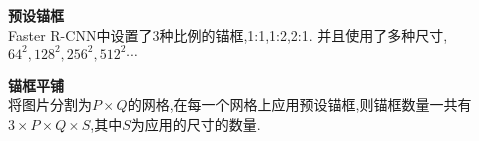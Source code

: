 \begin{frame}
    \vspace{0.5em}
    \noindent\large\textbf{预设锚框}\\
    \vspace{0.5em}
    Faster R-CNN中设置了3种比例的锚框,1:1,1:2,2:1. 并且使用了多种尺寸,$64^2,128^2,256^2,512^2\cdots$\\
    \begin{figure}

        \hspace{0.4cm}
        \hspace{0.4cm}
    \end{figure}
    \vspace{0.5em}
    \noindent\large\textbf{锚框平铺}\\
    \vspace{0.5em}
    将图片分割为$P\times Q$的网格,在每一个网格上应用预设锚框,则锚框数量一共有$3\times P\times Q\times S$,其中$S$为应用的尺寸的数量.
\end{frame}

